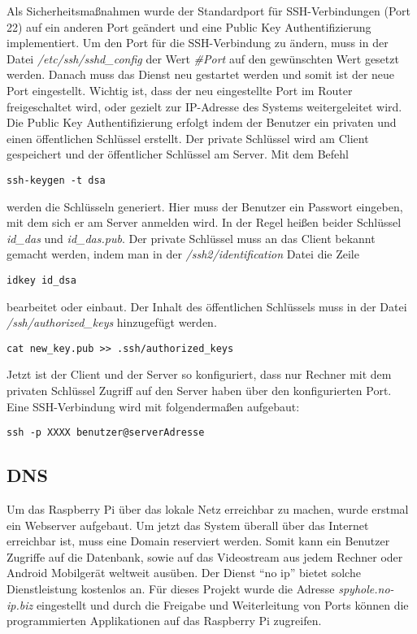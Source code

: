 Als Sicherheitsmaßnahmen wurde der Standardport für SSH-Verbindungen (Port 22) auf ein anderen Port geändert und eine Public Key Authentifizierung implementiert. Um den Port für die SSH-Verbindung zu ändern, muss in der Datei \textit{/etc/ssh/sshd\_config} der Wert \textit{\#Port} auf den gewünschten Wert gesetzt werden. Danach muss das Dienst neu gestartet werden und somit ist der neue Port eingestellt. Wichtig ist, dass der neu eingestellte Port im Router freigeschaltet wird, oder gezielt zur IP-Adresse des Systems weitergeleitet wird.\\

Die Public Key Authentifizierung erfolgt indem der Benutzer ein privaten und einen öffentlichen Schlüssel erstellt. Der private Schlüssel wird am Client gespeichert und der öffentlicher Schlüssel am Server. Mit dem Befehl

\begin{lstlisting}
ssh-keygen -t dsa
\end{lstlisting}

werden die Schlüsseln generiert. Hier muss der Benutzer ein Passwort eingeben, mit dem sich er am Server anmelden wird. In der Regel heißen beider Schlüssel \textit{id\_das} und \textit{id\_das.pub}. Der private Schlüssel muss an das Client bekannt gemacht werden, indem man in der \textit{/ssh2/identification} Datei die Zeile 

\begin{lstlisting}
idkey id_dsa
\end{lstlisting}

bearbeitet oder einbaut. Der Inhalt des öffentlichen Schlüssels muss in der Datei \textit{/ssh/authorized\_keys} hinzugefügt werden.

\begin{lstlisting}
cat new_key.pub >> .ssh/authorized_keys
\end{lstlisting}

Jetzt ist der Client und der Server so konfiguriert, dass nur Rechner mit dem privaten Schlüssel Zugriff auf den Server haben über den konfigurierten Port.
Eine SSH-Verbindung wird mit folgendermaßen aufgebaut:
\begin{lstlisting}
ssh -p XXXX benutzer@serverAdresse
\end{lstlisting}

\subsection{DNS}
Um das Raspberry Pi über das lokale Netz erreichbar zu machen, wurde erstmal ein Webserver aufgebaut. Um jetzt das System überall über das Internet erreichbar ist, muss eine Domain reserviert werden. Somit kann ein Benutzer Zugriffe auf die Datenbank, sowie auf das Videostream aus jedem Rechner oder Android Mobilgerät weltweit ausüben. Der Dienst ``no ip'' bietet solche Dienstleistung kostenlos an. Für dieses Projekt wurde die Adresse \textit{spyhole.no-ip.biz} eingestellt und durch die Freigabe und Weiterleitung von Ports können die programmierten Applikationen auf das Raspberry Pi zugreifen.\\

